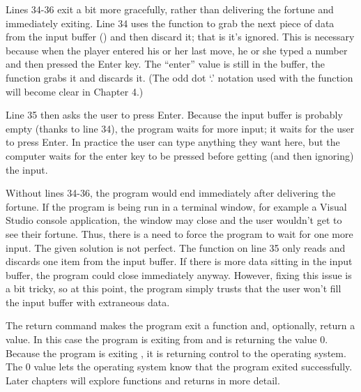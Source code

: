 Lines 34-36 exit a bit more gracefully, rather than delivering the fortune and immediately exiting.
Line 34 uses the  function to grab the next piece of data from the input buffer () and then discard it; that is it's ignored.  This is necessary because when the player entered his or her last move, he or she typed a number and then pressed the Enter key.  The ``enter'' value is still in the buffer, the  function grabs it and discards it.  (The odd dot `.' notation used with the  function will become clear in Chapter 4.)

Line 35 then asks the user to press Enter.  Because the input buffer is probably empty (thanks to line 34), the program waits for more input; it waits for the user to press Enter.  In practice the user can type anything they want here, but the computer waits for the enter key to be pressed before getting (and then ignoring) the input.  

Without lines 34-36, the program would end immediately after delivering the fortune.  If the program is being run in a terminal window, for example a Visual Studio console application, the window may close and the user wouldn't get to see their fortune.  Thus, there is a need to force the program to wait for one more input.  The given solution is not perfect.  The  function on line 35 only reads and discards one item from the input buffer.  If there is more data sitting in the input buffer, the program could close immediately anyway.  However, fixing this issue is a bit tricky, so at this point, the program simply trusts that the user won't fill the input buffer with extraneous data.  

 The return command makes the program exit a function and, optionally, return a value.  In this case the program is exiting from  and is returning the value 0.   Because the program is exiting , it is returning control to the operating system.  The 0 value lets the operating system know that the program exited successfully.  Later chapters will explore functions and returns in more detail.  %

\vspace{+0.25cm}
{\color{\mycolor}\noindent\hrulefill}
